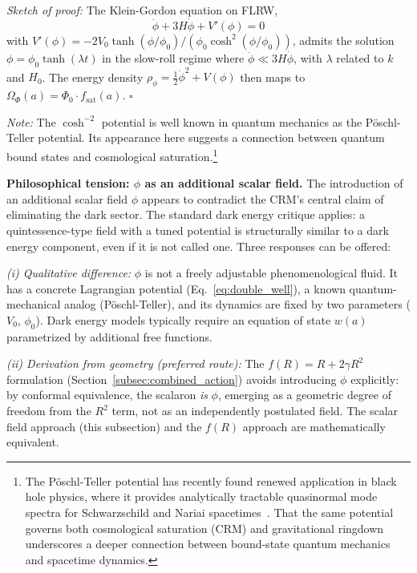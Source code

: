 \documentclass[aps,prd,twocolumn,superscriptaddress,nofootinbib]{revtex4-2}
\begin{document}
\textit{Sketch of proof:} The Klein-Gordon equation on FLRW,
\begin{equation}
\ddot{\phi} + 3H\dot{\phi} + V'(\phi) = 0
\end{equation}
with $V'(\phi) = -2V_0 \tanh(\phi/\phi_0)/(\phi_0 \cosh^2(\phi/\phi_0))$, admits the solution $\phi = \phi_0 \tanh(\lambda t)$ in the slow-roll regime where $\ddot{\phi} \ll 3H\dot{\phi}$, with $\lambda$ related to $k$ and $H_0$. The energy density $\rho_\phi = \frac{1}{2}\dot{\phi}^2 + V(\phi)$ then maps to $\Omega_\Phi(a) = \Phi_0 \cdot f_{\mathrm{sat}}(a)$. \hfill $\square$

\textit{Note:} The $\cosh^{-2}$ potential is well known in quantum mechanics as the P\"oschl-Teller potential. Its appearance here suggests a connection between quantum bound states and cosmological saturation.\footnote{The P\"oschl-Teller potential has recently found renewed application in black hole physics, where it provides analytically tractable quasinormal mode spectra for Schwarzschild and Nariai spacetimes~\cite{ZhongPT2022, NariaiQNM2025}. That the same potential governs both cosmological saturation (CRM) and gravitational ringdown underscores a deeper connection between bound-state quantum mechanics and spacetime dynamics.}

\textbf{Philosophical tension: $\phi$ as an additional scalar field.} The introduction of an additional scalar field $\phi$ appears to contradict the CRM's central claim of eliminating the dark sector. The standard dark energy critique applies: a quintessence-type field with a tuned potential is structurally similar to a dark energy component, even if it is not called one. Three responses can be offered:

\textit{(i) Qualitative difference:} $\phi$ is not a freely adjustable phenomenological fluid. It has a concrete Lagrangian potential (Eq.~\ref{eq:double_well}), a known quantum-mechanical analog (P\"oschl-Teller), and its dynamics are fixed by two parameters ($V_0$, $\phi_0$). Dark energy models typically require an equation of state $w(a)$ parametrized by additional free functions.

\textit{(ii) Derivation from geometry (preferred route):} The $f(R) = R + 2\gamma R^2$ formulation (Section~\ref{subsec:combined_action}) avoids introducing $\phi$ explicitly: by conformal equivalence, the scalaron \textit{is} $\phi$, emerging as a geometric degree of freedom from the $R^2$ term, not as an independently postulated field. The scalar field approach (this subsection) and the $f(R)$ approach are mathematically equivalent.
\end{document}
